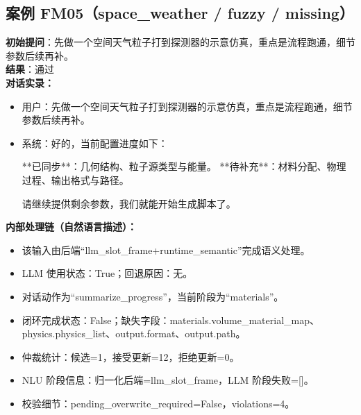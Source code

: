 \documentclass[11pt]{ctexart}
\begin{document}
\subsection{案例 FM05（space\_weather / fuzzy / missing）}
\textbf{初始提问}：先做一个空间天气粒子打到探测器的示意仿真，重点是流程跑通，细节参数后续再补。\\
\textbf{结果}：通过\\
\textbf{对话实录：}
\begin{itemize}
\item 用户：先做一个空间天气粒子打到探测器的示意仿真，重点是流程跑通，细节参数后续再补。
\item 系统：好的，当前配置进度如下：

**已同步**：几何结构、粒子源类型与能量。
**待补充**：材料分配、物理过程、输出格式与路径。

请继续提供剩余参数，我们就能开始生成脚本了。
\end{itemize}
\textbf{内部处理链（自然语言描述）：}
\begin{itemize}
\item 该输入由后端“llm\_slot\_frame+runtime\_semantic”完成语义处理。
\item LLM 使用状态：True；回退原因：无。
\item 对话动作为“summarize\_progress”，当前阶段为“materials”。
\item 闭环完成状态：False；缺失字段：materials.volume\_material\_map、physics.physics\_list、output.format、output.path。
\item 仲裁统计：候选=1，接受更新=12，拒绝更新=0。
\item NLU 阶段信息：归一化后端=llm\_slot\_frame，LLM 阶段失败=[]。
\item 校验细节：pending\_overwrite\_required=False，violations=4。
\end{itemize}
\end{document}
